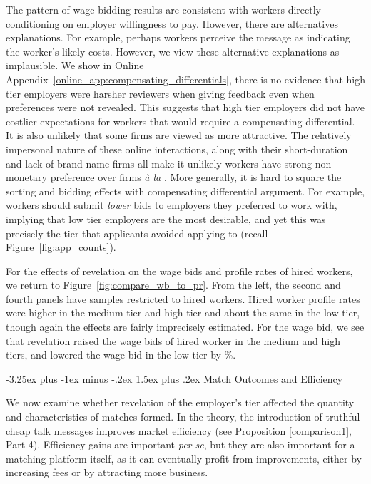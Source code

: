 \documentclass[12pt]{article}
\makeatletter
\renewcommand{\section}{%
  \@startsection{section}{1}{\z@}%
  {-3.5ex plus -1ex minus -.2ex}%
  {2.3ex plus.2ex}%
  {\normalfont\Large\bfseries}%
}
\renewcommand{\subsection}{%
  \@startsection{subsection}{2}{\z@}%
  {-3.25ex plus -1ex minus -.2ex}%
  {1.5ex plus .2ex}%
  {\normalfont\large\bfseries}%
}
\makeatother
\begin{document}
The pattern of wage bidding results are consistent with workers directly conditioning on employer willingness to pay.
However, there are alternatives explanations.
For example, perhaps workers perceive the message as indicating the worker's likely costs.
However, we view these alternative explanations as implausible. 
We show in Online Appendix~\ref{online_app:compensating_differentials}, there is no evidence that high tier employers were harsher reviewers when giving feedback even when preferences were not revealed.
This suggests that high tier employers did not have costlier expectations for workers that would require a compensating differential. 
It is also unlikely that some firms are viewed as more attractive.
The relatively impersonal nature of these online interactions, along with their short-duration and lack of brand-name firms all make it unlikely workers have strong non-monetary preference over firms \emph{\`{a} la} \cite{sorkin2018ranking}. 
More generally, it is hard to square the sorting and bidding effects with compensating differential argument. 
For example, workers should submit \emph{lower} bids to employers they preferred to work with, implying that low tier employers are the most desirable, and yet this was precisely the tier that applicants avoided applying to (recall Figure~\ref{fig:app_counts}).

For the effects of revelation on the wage bids and profile rates of hired workers, we return to Figure~\ref{fig:compare_wb_to_pr}.
From the left, the second and fourth panels have samples restricted to hired workers. 
Hired worker profile rates were higher in the medium tier and high tier and about the same in the low tier, though again the effects are fairly imprecisely estimated.
For the wage bid, we see that revelation raised the wage bids of hired worker in the medium and high tiers, and lowered the wage bid in the low tier by \EffectWageBidAppLowTierHiredRegression{}\%. 


\subsection{Match Outcomes and Efficiency} %

We now examine whether revelation of the employer's tier affected the quantity and characteristics of matches formed.
In the theory, the introduction of truthful cheap talk messages improves market efficiency (see Proposition \ref{comparison1}, Part 4).
Efficiency gains are important \emph{per se}, but they are also important for a matching platform itself, as it can eventually profit from improvements, either by increasing fees or by attracting more business. 
\end{document}

